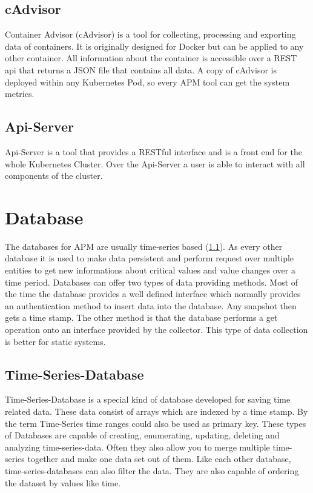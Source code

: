 \subsection{cAdvisor}
\label{cadvisor}
Container Advisor (cAdvisor) is a tool for collecting, processing and exporting data of containers. It is originally designed for Docker but can be applied to any other container. All information about the container is accessible over a REST api that returns a JSON file that contains all data. A copy of cAdvisor is deployed within any Kubernetes Pod, so every APM tool can get the system metrics.
\subsection{Api-Server}
\label{apiserver} 
Api-Server is a tool that provides a RESTful interface and is a front end for the whole Kubernetes Cluster. Over the Api-Server a user is able to interact with all components of the cluster. 
\section{Database}
The databases for APM are usually time-series based (\ref{TS-Database}). As every other database it is used to make data persistent and perform request over multiple entities to get new informations about critical values and value changes over a time period.
Databases can offer two types of data providing methods. Most of the time the database provides a well defined interface which normally provides an authentication method to insert data into the database. Any snapshot then gets a time stamp.
The other method is that the database performs a get operation onto an interface provided by the collector. This type of data collection is better for static systems.

\subsection{Time-Series-Database}
\label{TS-Database}
 Time-Series-Database is a special kind of database developed for saving time related data. These data consist of arrays which are indexed by a time stamp. By the term Time-Series time ranges could also be used as primary key. These types of Databases are capable of creating, enumerating, updating, deleting and analyzing time-series-data.
Often they also allow you to merge multiple time-series together and make one data set out of them.
Like each other database, time-series-databases can also filter the data. They are also capable of ordering the dataset by values like time.

